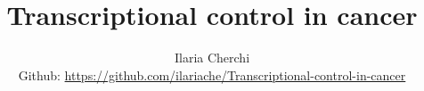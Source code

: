 
\title{\Huge\textbf{Transcriptional control in cancer}}
\author{
  Ilaria Cherchi\\
\small Github: \href{https://github.com/ilariache/Transcriptional-control-in-cancer}{https://github.com/ilariache/Transcriptional-control-in-cancer}\\}


\maketitle
\tableofcontents

    
    
    
    
    
    

